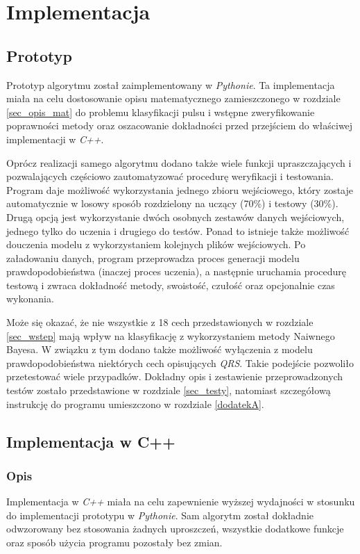 \section{Implementacja}
\label{sec_implementacja}

\subsection{Prototyp}
\label{subsec_prototyp}

Prototyp algorytmu został zaimplementowany w \textit{Pythonie}. Ta implementacja miała na celu dostosowanie opisu matematycznego zamieszczonego w rozdziale \ref{sec_opis_mat} do problemu klasyfikacji pulsu i wstępne zweryfikowanie poprawności metody oraz oszacowanie dokładności przed przejściem do właściwej implementacji w \textit{C++}. 

Oprócz realizacji samego algorytmu dodano także wiele funkcji upraszczających i pozwalających częściowo zautomatyzować procedurę weryfikacji i testowania. Program daje możliwość wykorzystania jednego zbioru wejściowego, który zostaje automatycznie w losowy sposób rozdzielony na uczący (70\%) i testowy (30\%). Drugą opcją jest wykorzystanie dwóch osobnych zestawów danych wejściowych, jednego tylko do uczenia i drugiego do testów. Ponad to istnieje także możliwość douczenia modelu z wykorzystaniem kolejnych plików wejściowych. Po załadowaniu danych, program przeprowadza proces generacji modelu prawdopodobieństwa (inaczej proces uczenia), a następnie uruchamia procedurę testową i zwraca dokładność metody, swoistość, czułość oraz opcjonalnie czas wykonania.

Może się okazać, że nie wszystkie z 18 cech przedstawionych w rozdziale \ref{sec_wstep} mają wpływ na klasyfikację z wykorzystaniem metody Naiwnego Bayesa. W związku z tym dodano także możliwość wyłączenia z modelu prawdopodobieństwa niektórych cech opisujących \textit{QRS}. Takie podejście pozwoliło przetestować wiele przypadków. Dokładny opis i zestawienie przeprowadzonych testów zostało przedstawione w rozdziale \ref{sec_testy}, natomiast szczegółową instrukcję do programu umieszczono w rozdziale \ref{dodatekA}.


\subsection{Implementacja w C++}
\label{subsec_implementacja_cpp}

\subsubsection{Opis}
Implementacja w \textit{C++} miała na celu zapewnienie wyższej wydajności w stosunku do implementacji prototypu w \textit{Pythonie}. Sam algorytm został dokładnie odwzorowany bez stosowania żadnych uproszczeń, wszystkie dodatkowe funkcje oraz sposób użycia programu pozostały bez zmian. 

